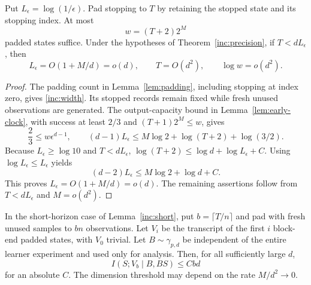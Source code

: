 \begin{lemma}\label{inc:short}
Put \(L_\epsilon=\log(1/\epsilon)\).  Pad stopping to \(T\) by retaining
the stopped state and its stopping index.  At most
\begin{equation}\label{inc:width}
 w=(T+2)2^M
\end{equation}
padded states suffice.  Under the hypotheses of
Theorem~\ref{inc:precision}, if \(T<dL_\epsilon\), then
\begin{equation}\label{inc:short-bounds}
 L_\epsilon=O(1+M/d)=o(d),\qquad
 T=O(d^2),\qquad \log w=o(d^2).
\end{equation}
\end{lemma}

\begin{proof}
The padding count in Lemma~\ref{lem:padding}, including stopping at
index zero, gives \eqref{inc:width}.  Its stopped records remain fixed
while fresh unused observations are generated.
The output-capacity bound in Lemma~\ref{lem:early-clock}, with success
at least \(2/3\) and \((T+1)2^M\le w\), gives
\[
 \frac23\le w\epsilon^{d-1},\qquad
 (d-1)L_\epsilon\le
 M\log2+\log(T+2)+\log(3/2).
\]
Because \(L_\epsilon\ge\log10\) and \(T<dL_\epsilon\),
\(\log(T+2)\le\log d+\log L_\epsilon+C\).
Using \(\log L_\epsilon\le L_\epsilon\) yields
\[
 (d-2)L_\epsilon\le M\log2+\log d+C.
\]
This proves \(L_\epsilon=O(1+M/d)=o(d)\).  The remaining assertions
follow from \(T<dL_\epsilon\) and \(M=o(d^2)\).
\end{proof}

\begin{lemma}\label{inc:history}
In the short-horizon case of Lemma~\ref{inc:short}, put
\(b=\lceil T/n\rceil\) and pad with fresh unused samples to \(bn\)
observations.  Let \(V_i\) be the transcript of the first \(i\)
block-end padded states, with \(V_0\) trivial.  Let
\(B\sim\gamma_{p,d}\) be independent of the entire learner experiment
and used only for analysis.  Then, for all sufficiently large \(d\),
\begin{equation}\label{inc:history-bound}
 I(S;V_b\mid B,BS)\le Cbd
\end{equation}
for an absolute \(C\).  The dimension threshold may depend on the
rate \(M/d^2\to0\).
\end{lemma}

